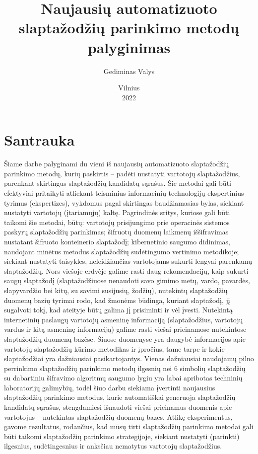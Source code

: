 \documentclass{VUMIFInfBakalaurinis}
\institute{Duomenų mokslo ir skaitmeninių technologijų institutas}
\title{Naujausių automatizuoto slaptažodžių parinkimo metodų palyginimas}
\author{Gediminas Valys}
\date{Vilnius \\ 2022}
\begin{document}
\maketitle

\tableofcontents


\section{Santrauka}
Šiame darbe palyginami du vieni iš naujausių automatizuoto slaptažodžių 
parinkimo metodų, kurių paskirtis -- padėti nustatyti vartotojų slaptažodžius, 
parenkant skirtingus slaptažodžių kandidatų sąrašus. Šie metodai gali būti 
efektyviai pritaikyti atliekant teisminius informacinių technologijų 
ekspertinius tyrimus (ekspertizes), vykdomus pagal skirtingas baudžiamasias 
bylas, siekiant nustatyti vartotojų (įtariamųjų) kaltę. Pagrindinės sritys, 
kuriose gali būti taikomi šie metodai, būtų: vartotojų prisijungimo prie 
operacinės sistemos paskyrų slaptažodžių parinkimas; šifruotų duomenų laikmenų 
iššifravimas nustatant šifruoto konteinerio slaptažodį; kibernetinio saugumo 
didinimas, naudojant minėtus metodus slaptažodžių sudėtingumo vertinimo 
metodikoje; siekiant nustatyti taisykles, neleidžiančias vartotojams sukurti 
lengvai parenkamų slaptažodžių. Nors viešoje erdvėje galime rasti daug 
rekomendacijų, kaip sukurti saugų slaptažodį (slaptažodžiuose nenaudoti savo 
gimimo metų, vardo, pavardės, slapyvardžio bei kitų, su savimi susijusių, 
žodžių), nutekintų slaptažodžių duomenų bazių tyrimai rodo, kad žmonėms būdinga, 
kuriant slaptažodį, jį sugalvoti tokį, kad ateityje būtų galima jį
prisiminti ir vėl įvesti. Nutekintą internetinių paslaugų vartotojų asmeninę 
informaciją (slaptažodžius, vartotojų vardus ir kitą asmeninę informaciją) 
galime rasti viešai prieinamose nutekintose slaptažodžių duomenų bazėse. Šiuose 
duomenyse yra daugybė informacijos apie vartotojų slaptažodžių kūrimo metodikas 
ir įpročius, tame tarpe ir kokie slaptažodžiai yra dažniausiai pasikartojantys. 
Vienas dažniausiai naudojamų pilno perrinkimo slaptažodžių parinkimo metodų 
ilgesnių nei 6 simbolių slaptažodžių su dabartiniu šifravimo algoritmų saugumo 
lygiu yra labai apribotas techninių laboratorijų galimybių, todėl šiuo darbu 
siekiama įvertinti naujausius slaptažodžių parinkimo metodus, kurie automatiškai 
generuoja slaptažodžių kandidatų sąrašus, stengdamiesi išnaudoti viešai 
prieinamus duomenis apie vartotojus -- nutekintas slaptažodžių duomenų bazes. 
Atlikę eksperimentus, gavome rezultatus, rodančius, kad mūsų tirti slaptažodžių 
parinkimo metodai gali būti taikomi slaptažodžių parinkimo strategijoje, 
siekiant nustatyti (parinkti) ilgesnius, sudėtingesnius ir anksčiau nematytus 
vartotojų slaptažodžius.
\end{document}
